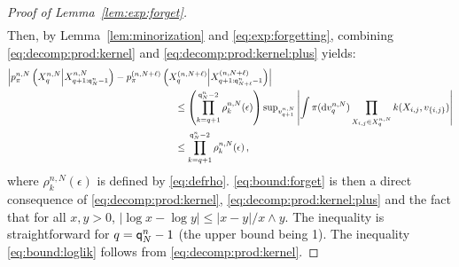 \begin{proof}[Proof of Lemma~\ref{lem:exp:forget}]
\begin{multline}
\end{multline}
Then, by Lemma~\ref{lem:minorization} and \eqref{eq:exp:forgetting}, combining \eqref{eq:decomp:prod:kernel} and \eqref{eq:decomp:prod:kernel:plus} yields:
\begin{align*}
\left|p_{\pi}^{n,N}\left(X_{q}^{n,N}\middle|X_{q+1:\ordermax{n}{N}-1}^{n,N}\right) -  p_{\pi}^{(n,N+\ell)}\left(X_{q}^{(n,N+\ell)}\middle|X_{q+1:\ordermax{n}{N+\ell}-1}^{(n,N+\ell)}\right) \right|&\\
&\hspace{-3.5cm}\leq \left(\prod_{k=q+1}^{\ordermax{n}{N}-2}\rho^{n,N}_k(\epsilon)\right) \sup_{v^{n,N}_{q+1}}\left|\int\pi(\rmd v^{n,N}_q)\prod_{X_{i,j}\in X_{q}^{n,N}}\condlik(X_{i,j},v_{\{i,j\}})\right|\\
&\hspace{-3.5cm}\le \prod_{k=q+1}^{\ordermax{n}{N}-2}\rho^{n,N}_k(\epsilon)\eqsp,
\end{align*}
where $\rho^{n,N}_k(\epsilon)$ is defined by \eqref{eq:defrho}. \eqref{eq:bound:forget} is then a direct consequence of \eqref{eq:decomp:prod:kernel}, \eqref{eq:decomp:prod:kernel:plus} and the fact that 
for all $x,y>0$, $|\log x - \log y| \le |x-y|/x\wedge y$. The inequality is straightforward for $q = {\mathsf{q}}^{n}_{N}-1$ (the upper bound being 1).
The inequality \eqref{eq:bound:loglik} follows from \eqref{eq:decomp:prod:kernel}. 
\end{proof}



